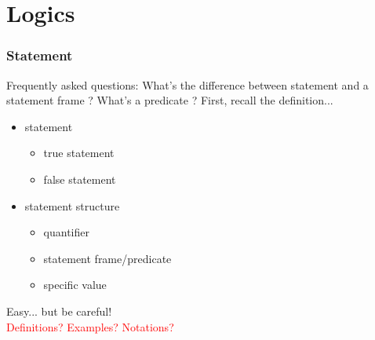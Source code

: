 \documentclass{beamer}
\newcommand{\myfont}{\rmfamily\normalsize\upshape\mdseries}
\begin{document}
\section{Logics}
\begin{frame}
    \frametitle{Statement}
    \small Frequently asked questions: What's the difference between statement and a statement frame ? What's a predicate ?
    First, recall the definition...
    \vspace*{0.5em}
    \begin{itemize}
        \item statement
              \begin{itemize}
                  \item true statement
                  \item false statement
              \end{itemize}
        \item statement structure
              \begin{itemize}
                  \item quantifier
                  \item statement frame/predicate
                  \item specific value
              \end{itemize}
    \end{itemize}
    \vspace*{1em}
    \myfont
    Easy... but be careful! \\
    \textcolor{red}{Definitions? Examples? Notations?}
\end{frame}
\end{document}
